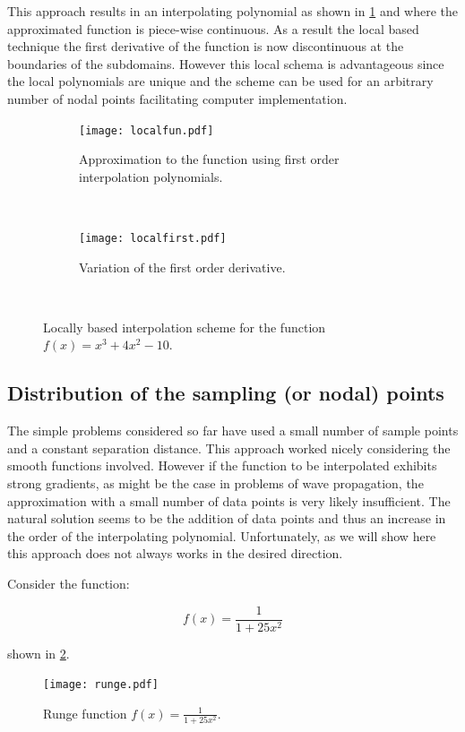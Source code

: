 This approach results in an interpolating polynomial as shown in \cref{fig:fully local 1} and where the approximated function is piece-wise continuous. As a result the local based technique the first derivative of the function is now discontinuous at the boundaries of the subdomains. However this local schema is advantageous since the local polynomials are unique and the scheme can be used for an arbitrary number of nodal points facilitating computer implementation.


\begin{figure}[H]
\centering
	\begin{subfigure}[b]{0.45\textwidth}\qquad
		\texttt{[image: localfun.pdf]}
		\caption{Approximation to the function using first order interpolation polynomials.}
	\end{subfigure}\,
%
	\begin{subfigure}[b]{0.45\textwidth}\qquad
		\texttt{[image: localfirst.pdf]}
		\caption{Variation of the first order derivative.}
	\end{subfigure}\\

\caption{Locally based interpolation scheme for the function $f(x) = {x^3} + 4{x^2} - 10$.}
\label{fig:fully local 1}
\end{figure}



\subsection{Distribution of the sampling (or nodal) points}
The simple problems considered so far have used a small number of sample points and a constant separation distance. This approach worked nicely considering the smooth functions involved. However if the function to be interpolated exhibits strong gradients, as might be the case in problems of wave propagation, the approximation with a small number of data points is very likely insufficient. The natural solution seems to be the addition of data points and thus an increase in the order of the interpolating polynomial. Unfortunately, as we will show here this approach does not always works in the desired direction.


Consider the function:

\[f(x) = \frac{1}{{1 + 25{x^2}}}\]

shown in \cref{fig:rungelag}.

\begin{figure}[H]
\centering
\texttt{[image: runge.pdf]}
\caption{Runge function $f(x) = \frac{1}{1 + 25{x^2}}$.}
\label{fig:rungelag}
\end{figure}

